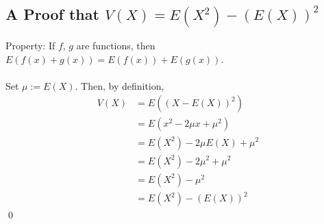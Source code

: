 \documentclass{article}
\begin{document}
\subsection{A Proof that $V(X) = E(X^{2}) - (E(X))^{2}$}
Property: If $f$, $g$ are functions, then $E(f(x) + g(x)) = E(f(x)) + E(g(x))$.\\\\
Set $\mu := E(X)$. Then, by definition,
\begin{align*}
	V(X) &= E((X-E(X))^{2})\\
		&= E(x^{2} -2\mu x + \mu^{2})\\
		&= E(X^{2}) -2\mu E(X) + \mu^{2}\\
		&= E(X^{2})-2\mu^{2} + \mu^{2}\\
		&= E(X^{2}) - \mu^{2}\\
		&= E(X^{2}) - (E(X))^{2}
\end{align*}
\qed
\end{document}
